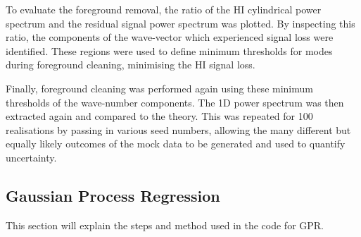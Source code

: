 To evaluate the foreground removal, the ratio of the HI cylindrical power spectrum and the residual signal power spectrum was plotted. By inspecting this ratio, the components of the wave-vector which experienced signal loss were identified. These regions were used to define minimum thresholds for modes during foreground cleaning, minimising the HI signal loss. 

Finally, foreground cleaning was performed again using these minimum thresholds of the wave-number components. The 1D power spectrum was then extracted again and compared to the theory. This was repeated for 100 realisations by passing in various seed numbers, allowing the many different but equally likely outcomes of the mock data to be generated and used to quantify uncertainty. 

\subsection{Gaussian Process Regression}

This section will explain the steps and method used in the code for GPR.